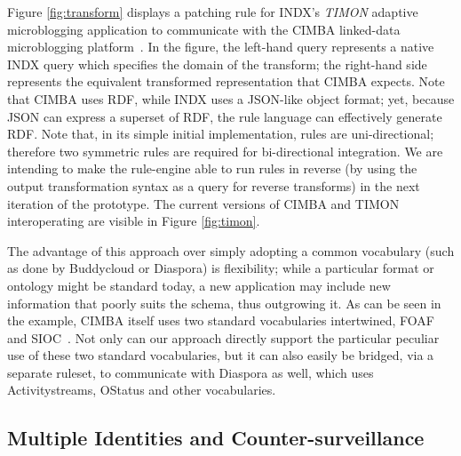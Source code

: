 \documentclass{sig-alternate}
\begin{document}
Figure \ref{fig:transform} displays a patching rule for INDX's \emph{TIMON} adaptive microblogging application to communicate with the CIMBA linked-data microblogging platform~\cite{sambracimba, presbrey2014linked}. In the figure, the left-hand query represents a native INDX query which specifies the domain of the transform; the right-hand side represents the equivalent transformed representation that CIMBA expects. Note that CIMBA uses RDF, while INDX uses a JSON-like object format; yet, because JSON can express a superset of RDF, the rule language can effectively generate RDF. Note that, in its simple initial implementation, rules are uni-directional; therefore two symmetric rules are required for bi-directional integration. We are intending to make the rule-engine able to run rules in reverse (by using the output transformation syntax as a query for reverse transforms) in the next iteration of the prototype.  The current versions of CIMBA and TIMON interoperating are visible in Figure \ref{fig:timon}.

The advantage of this approach over simply adopting a common vocabulary (such as done by Buddycloud or Diaspora) is flexibility; while a particular format or ontology might be standard today, a new application may include new information that poorly suits the schema, thus outgrowing it.  As can be seen in the example, CIMBA itself uses two standard vocabularies intertwined, FOAF~\cite{brickley2012foaf} and SIOC~\cite{champin2010sioc}.  Not only can our approach directly support the particular peculiar use of these two standard vocabularies, but it can also easily be bridged, via a separate ruleset, to communicate with Diaspora as well, which uses Activitystreams, OStatus and other vocabularies.  

\subsection{Multiple Identities and Counter-surveillance}

\end{document}
